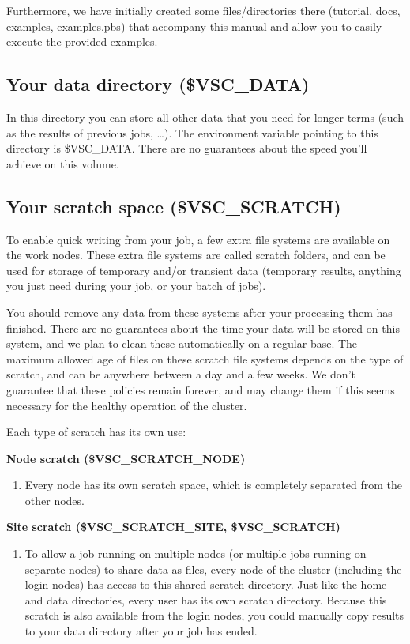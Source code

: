Furthermore, we have initially created some files/directories there (tutorial,
docs,  examples, examples.pbs) that accompany  this manual and allow you to
easily execute the provided examples.

\subsection{Your data directory (\$VSC\_DATA)}

In this directory you can store all other data that you need for longer terms
(such as the results of previous jobs, \ldots). The environment variable
pointing to this directory is \$VSC\_DATA. There are no guarantees about the
speed you'll achieve on this volume.

\subsection{Your scratch space (\$VSC\_SCRATCH)}

To enable quick writing from your job, a few extra file systems are available
on the work nodes. These extra file systems are called scratch folders, and can
be used for storage of temporary and/or transient data (temporary results,
anything you just need during your job, or your batch of jobs).

You should remove any data from these systems after your processing them has
finished. There are no guarantees about the time your data will be stored on
this system, and we plan to clean these automatically on a regular base. The
maximum allowed age of files on these scratch file systems depends on the type
of scratch, and can be anywhere between a day and a few weeks. We don't
guarantee that these policies remain forever, and may change them if this seems
necessary for the healthy operation of the cluster.

Each type of scratch has its own use:

\textbf{Node scratch (\$VSC\_SCRATCH\_NODE)}
\begin{enumerate}
\item Every node has its own scratch space, which is completely separated from the other nodes.
\end{enumerate}

\textbf{Site scratch (\$VSC\_SCRATCH\_SITE, \$VSC\_SCRATCH)}
\begin{enumerate}
  \item To allow a job running on multiple nodes (or multiple jobs running on
    separate nodes) to share data as files, every node of the cluster
    (including the login nodes) has access to this shared scratch directory.
    Just like the home and data directories, every user has its own scratch
    directory. Because this scratch is also available from the login nodes, you
    could manually copy results to your data directory after your job has
    ended.
\end{enumerate}

